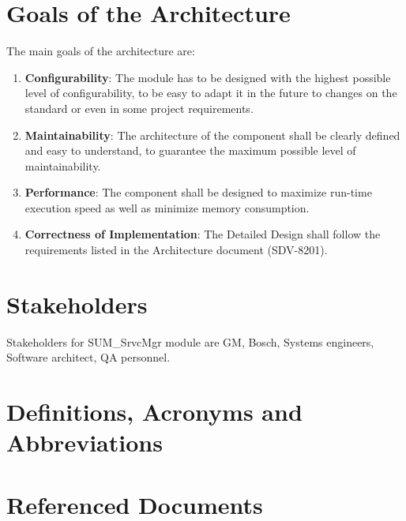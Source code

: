 \section{Goals of the Architecture}

The main goals of the architecture are:

\begin{enumerate}
\item \textbf{Configurability}: The module has to be designed with the highest possible level of configurability, to be easy to adapt it in the future to changes on the standard or even in some project requirements.
\item \textbf{Maintainability}: The architecture of the component shall be clearly defined and easy to understand, to guarantee the maximum possible level of maintainability.
\item \textbf{Performance}: The component shall be designed to maximize run-time execution speed as well as minimize memory consumption.
\item \textbf{Correctness of Implementation}: The Detailed Design shall follow the requirements listed in the Architecture document (SDV-8201).
\end{enumerate}

\section{Stakeholders}

Stakeholders for SUM\_SrvcMgr module are GM, Bosch, Systems engineers, Software architect, QA personnel.

\section{Definitions, Acronyms and Abbreviations}



\section{Referenced Documents}

